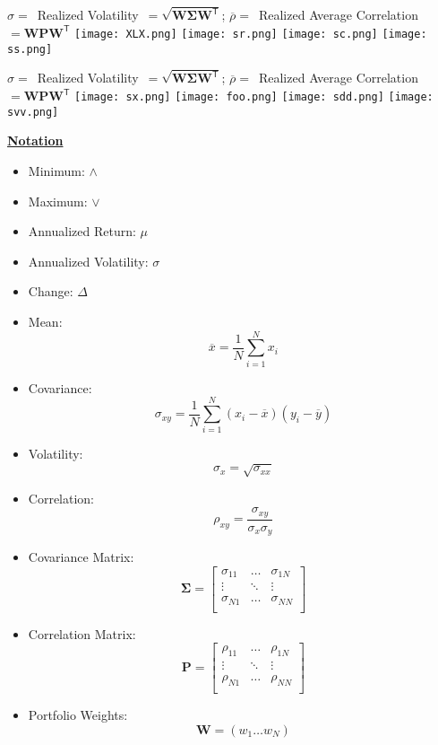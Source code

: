 \documentclass[6pt]{article}
\begin{document}
\begin{center}
\newpage

\Large{
  $\sigma=$\ Realized Volatility\ $=\sqrt{\mathbf{W}\mathbf{\Sigma}\mathbf{W^\mathsf{T}}}$; 
  $\overline{\rho}=$\ Realized Average Correlation\ $=\mathbf{W}\mathbf{P}\mathbf{W^\mathsf{T}}$
}
\texttt{[image: XLX.png]}
\texttt{[image: sr.png]}
\texttt{[image: sc.png]}
\texttt{[image: ss.png]}

\newpage

\Large{
  $\sigma=$\ Realized Volatility\ $=\sqrt{\mathbf{W}\mathbf{\Sigma}\mathbf{W^\mathsf{T}}}$; 
  $\overline{\rho}=$\ Realized Average Correlation\ $=\mathbf{W}\mathbf{P}\mathbf{W^\mathsf{T}}$
}
\texttt{[image: sx.png]}
\texttt{[image: foo.png]}
\texttt{[image: sdd.png]}
\texttt{[image: svv.png]}

\end{center}
 
\newpage

\underline{\textbf{Notation}}

\begin{itemize}
  \item Minimum: $\wedge$
  \item Maximum: $\vee$
  \item Annualized Return: $\mu$
  \item Annualized Volatility: $\sigma$
  \item Change: $\Delta$
  \item Mean: $$\overline{x}=\frac{1}{N}\sum_{i=1}^Nx_{i}$$
  \item Covariance: $$\sigma_{xy}=\frac{1}{N}\sum_{i=1}^N(x_{i}-\overline{x})(y_{i}-\overline{y})$$
  \item Volatility: $$\sigma_{x}=\sqrt{\sigma_{xx}}$$
  \item Correlation: $$\rho_{xy}=\frac{\sigma_{xy}}{\sigma_{x}\sigma_{y}}$$
  \item Covariance Matrix: $$\mathbf{\Sigma}=
    \begin{bmatrix}
      \sigma_{11} & \ldots & \sigma_{1N} \\
      \vdots & \ddots & \vdots \\
      \sigma_{N1} & \ldots & \sigma_{NN} \\
    \end{bmatrix}
  $$
  \item Correlation Matrix: $$\mathbf{P}=
    \begin{bmatrix}
      \rho_{11} & \ldots & \rho_{1N} \\
      \vdots & \ddots & \vdots \\
      \rho_{N1} & \ldots & \rho_{NN} \\
    \end{bmatrix}
  $$
  \item Portfolio Weights: $$\mathbf{W}=(w_{1} \ldots w_{N})$$
\end{itemize}
\end{document}
